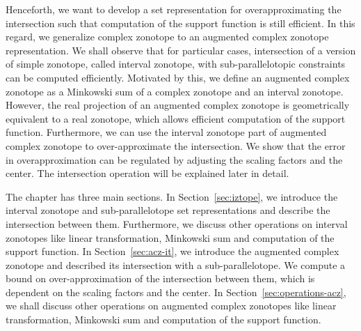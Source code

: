 Henceforth, we want to develop a set representation for
overapproximating the intersection such that computation of the
support function is still efficient.  In this regard, we generalize
complex zonotope to an augmented complex zonotope representation.  We
shall observe that for particular cases, intersection of a version of
simple zonotope, called interval zonotope, with sub-parallelotopic
constraints can be computed efficiently.  Motivated by this, we define
an augmented complex zonotope as a Minkowski sum of a complex zonotope
and an interval zonotope.  However, the real projection of an
augmented complex zonotope is geometrically equivalent to a real
zonotope, which allows efficient computation of the support function.
Furthermore, we can use the interval zonotope part of augmented
complex zonotope to over-approximate the intersection.  We show that
the error in overapproximation can be regulated by adjusting the
scaling factors and the center.  The intersection operation will be
explained later in detail.


The chapter has three main sections.  In Section~\ref{sec:iztope}, we
introduce the interval zonotope and sub-parallelotope set
representations and describe the intersection between them.
Furthermore, we discuss other operations on interval zonotopes like
linear transformation, Minkowski sum and computation of the support
function.  In Section~\ref{sec:acz-it}, we introduce the augmented
complex zonotope and described its intersection with a
sub-parallelotope.  We compute a bound on over-approximation of the
intersection between them, which is dependent on the scaling factors
and the center.  In Section~\ref{sec:operations-acz}, we shall discuss
other operations on augmented complex zonotopes like linear
transformation, Minkowski sum and computation of the support function.
